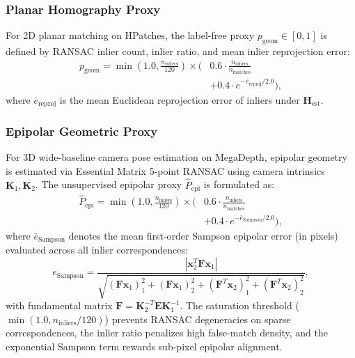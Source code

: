 \documentclass[conference]{IEEEtran}
\begin{document}
\subsubsection{Planar Homography Proxy}
For 2D planar matching on HPatches, the label-free proxy $p_{\text{geom}} \in [0, 1]$ is defined by RANSAC inlier count, inlier ratio, and mean inlier reprojection error:
\begin{equation}
\begin{aligned} p_{\text{geom}} = \min\left(1.0, \frac{n_{\text{inliers}}}{120}\right) \times \Big( &0.6 \cdot \frac{n_{\text{inliers}}}{n_{\text{matches}}} \\ &+ 0.4 \cdot e^{-\bar{e}_{\text{reproj}}/2.0}\Big), \end{aligned}
\end{equation}
where $\bar{e}_{\text{reproj}}$ is the mean Euclidean reprojection error of inliers under $\mathbf{H}_{\text{est}}$.

\subsubsection{Epipolar Geometric Proxy}
For 3D wide-baseline camera pose estimation on MegaDepth, epipolar geometry is estimated via Essential Matrix 5-point RANSAC using camera intrinsics $\mathbf{K}_1, \mathbf{K}_2$. The unsupervised epipolar proxy $\hat{P}_{\text{epi}}$ is formulated as:
\begin{equation}
\begin{aligned} \hat{P}_{\text{epi}} = \min\left(1.0, \frac{n_{\text{inliers}}}{120}\right) \times \Big( &0.6 \cdot \frac{n_{\text{inliers}}}{n_{\text{matches}}} \\ &+ 0.4 \cdot e^{-\bar{e}_{\text{Sampson}}/2.0}\Big), \end{aligned}
\end{equation}
where $\bar{e}_{\text{Sampson}}$ denotes the mean first-order Sampson epipolar error (in pixels) evaluated across all inlier correspondences:
\begin{equation}
e_{\text{Sampson}} = \frac{|\mathbf{x}_2^T \mathbf{F} \mathbf{x}_1|}{\sqrt{(\mathbf{F} \mathbf{x}_1)_1^2 + (\mathbf{F} \mathbf{x}_1)_2^2 + (\mathbf{F}^T \mathbf{x}_2)_1^2 + (\mathbf{F}^T \mathbf{x}_2)_2^2}},
\end{equation}
with fundamental matrix $\mathbf{F} = \mathbf{K}_2^{-T} \mathbf{E} \mathbf{K}_1^{-1}$. The saturation threshold ($\min(1.0, n_{\text{inliers}}/120)$) prevents RANSAC degeneracies on sparse correspondences, the inlier ratio penalizes high false-match density, and the exponential Sampson term rewards sub-pixel epipolar alignment.
\end{document}
